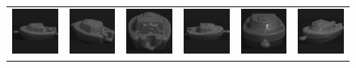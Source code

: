 \begin{figure}[p]
\begin{tabular}{cccccc}
\includegraphics[width=2cm]{coil/beeld-24.eps} &
\includegraphics[width=2cm]{coil/beeld-25.eps} &
\includegraphics[width=2cm]{coil/beeld-26.eps} &
\includegraphics[width=2cm]{coil/beeld-27.eps} &
\includegraphics[width=2cm]{coil/beeld-28.eps} &
\includegraphics[width=2cm]{coil/beeld-29.eps} \\


\end{tabular}
\end{figure}
